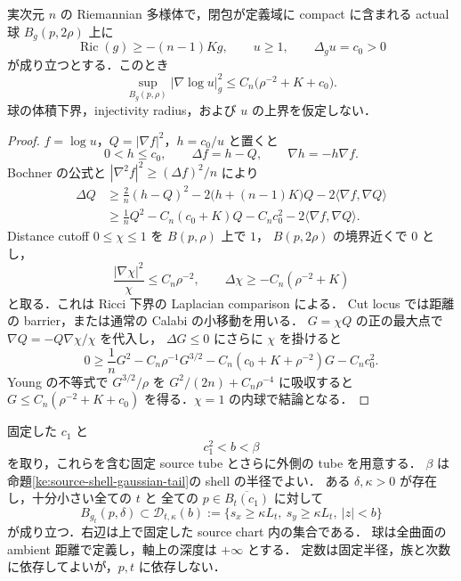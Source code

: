 \begin{lemma}
\label{ke:positive-poisson-log-gradient}
実次元 $n$ の Riemannian 多様体で，閉包が定義域に compact に含まれる actual 球
$B_g(p,2\rho)$ 上に
\[
 \operatorname{Ric}(g)\ge-(n-1)K g,\qquad
 u\ge1,\qquad \Delta_g u=c_0>0
\]
が成り立つとする．このとき
\begin{equation}\label{ke:eq:positive-poisson-log-gradient}
 \sup_{B_g(p,\rho)}|\nabla\log u|_g^2
 \le C_n\bigl(\rho^{-2}+K+c_0\bigr).
\end{equation}
球の体積下界，injectivity radius，および $u$ の上界を仮定しない．
\end{lemma}

\begin{proof}
$f=\log u$，$Q=|\nabla f|^2$，$h=c_0/u$ と置くと
\[
 0<h\le c_0,\qquad \Delta f=h-Q,\qquad \nabla h=-h\nabla f.
\]
Bochner の公式と $|\nabla^2 f|^2\ge(\Delta f)^2/n$ により
\begin{align*}
 \Delta Q
 &\ge \frac2n(h-Q)^2
      -2\bigl(h+(n-1)K\bigr)Q
      -2\langle\nabla f,\nabla Q\rangle\\
 &\ge \frac1n Q^2
      -C_n(c_0+K)Q-C_nc_0^2
      -2\langle\nabla f,\nabla Q\rangle.
\end{align*}
Distance cutoff $0\le\chi\le1$ を $B(p,\rho)$ 上で $1$，
$B(p,2\rho)$ の境界近くで $0$ とし，
\[
 \frac{|\nabla\chi|^2}{\chi}\le C_n\rho^{-2},\qquad
 \Delta\chi\ge-C_n(\rho^{-2}+K)
\]
と取る．これは Ricci 下界の Laplacian comparison による．
Cut locus では距離の barrier，または通常の Calabi の小移動を用いる．
$G=\chi Q$ の正の最大点で $\nabla Q=-Q\nabla\chi/\chi$ を代入し，
$\Delta G\le0$ にさらに $\chi$ を掛けると
\[
 0\ge \frac1n G^2-C_n\rho^{-1}G^{3/2}
       -C_n(c_0+K+\rho^{-2})G-C_nc_0^2.
\]
Young の不等式で $G^{3/2}/\rho$ を $G^2/(2n)+C_n\rho^{-4}$ に吸収すると
$G\le C_n(\rho^{-2}+K+c_0)$ を得る．$\chi=1$ の内球で結論となる．
\end{proof}

\begin{proposition}
\label{ke:source-potential-buffer}
固定した $c_1$ と
\[
 c_1^2<b<\beta
\]
を取り，これらを含む固定 source tube とさらに外側の tube を用意する．
$\beta$ は命題\ref{ke:source-shell-gaussian-tail}の shell の半径でよい．
ある $\delta,\kappa>0$ が存在し，十分小さい全ての $t$ と
全ての $p\in\overline{B_t(c_1)}$ に対して
\begin{equation}\label{ke:eq:source-potential-buffer}
 B_{g_t}(p,\delta)
 \subset\mathcal D_{t,\kappa}(b)
 :=\{s_x\ge\kappa L_t,\ s_y\ge\kappa L_t,\ |z|<b\}
\end{equation}
が成り立つ．右辺は上で固定した source chart 内の集合である．
球は全曲面の ambient 距離で定義し，軸上の深度は $+\infty$ とする．
定数は固定半径，族と次数に依存してよいが，$p,t$ に依存しない．
\end{proposition}

